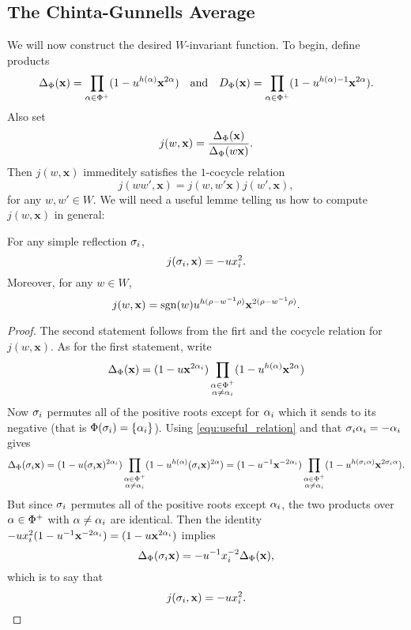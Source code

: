     \subsection*{The Chinta-Gunnells Average}
        We will now construct the desired $W$-invariant function. To begin, define products
        \[
            \Delta_{\Phi}(\mathbf{x}) = \prod_{\alpha \in \Phi^{+}}(1-u^{h(\alpha)}\mathbf{x}^{2\alpha}) \quad \text{and} \quad  D_{\Phi}(\mathbf{x}) = \prod_{\alpha \in \Phi^{+}}(1-u^{h(\alpha)-1}\mathbf{x}^{2\alpha}).
        \]
        Also set
        \[
            j(w,\mathbf{x}) = \frac{\Delta_{\Phi}(\mathbf{x})}{\Delta_{\Phi}(w\mathbf{x})}.
        \]
        Then $j(w,\mathbf{x})$ immeditely satisfies the $1$-cocycle relation
        \[
            j(ww',\mathbf{x}) = j(w,w'\mathbf{x})j(w',\mathbf{x}),
        \]
        for any $w,w' \in W$. We will need a useful lemme telling us how to compute $j(w,\mathbf{x})$ in general:

        \begin{lemma}\label{lem:cocycle_computation}
            For any simple reflection $\sigma_{i}$,
            \[
                j(\sigma_{i},\mathbf{x}) = -ux_{i}^{2}.
            \]
            Moreover, for any $w \in W$,
            \[
                j(w,\mathbf{x}) = \operatorname{\mathrm{sgn}}(w)u^{h(\rho-w^{-1}\rho)}\mathbf{x}^{2(\rho-w^{-1}\rho)}.
            \]
        \end{lemma}
        \begin{proof}
            The second statement follows from the firt and the cocycle relation for $j(w,\mathbf{x})$. As for the first statement, write
            \[
                \Delta_{\Phi}(\mathbf{x}) = (1-u\mathbf{x}^{2\alpha_{i}})\prod_{\substack{\alpha \in \Phi^{+} \\ \alpha \neq \alpha_{i}}}(1-u^{h(\alpha)}\mathbf{x}^{2\alpha})
            \]
            Now $\sigma_{i}$ permutes all of the positive roots except for $\alpha_{i}$ which it sends to its negative (that is $\Phi(\sigma_{i}) = \{\alpha_{i}\}$). Using \cref{equ:useful_relation} and that $\sigma_{i}\alpha_{i} = -\alpha_{i}$ gives
            \[
                \Delta_{\Phi}(\sigma_{i}\mathbf{x}) = (1-u(\sigma_{i}\mathbf{x})^{2\alpha_{i}})\prod_{\substack{\alpha \in \Phi^{+} \\ \alpha \neq \alpha_{i}}}(1-u^{h(\alpha)}(\sigma_{i}\mathbf{x})^{2\alpha}) = (1-u^{-1}\mathbf{x}^{-2\alpha_{i}})\prod_{\substack{\alpha \in \Phi^{+} \\ \alpha \neq \alpha_{i}}}(1-u^{h(\sigma_{i}\alpha)}\mathbf{x}^{2\sigma_{i}\alpha}).
            \]
            But since $\sigma_{i}$ permutes all of the positive roots except $\alpha_{i}$, the two products over $\alpha \in \Phi^{+}$ with $\alpha \neq \alpha_{i}$ are identical. Then the identity $-ux_{i}^{2}(1-u^{-1}\mathbf{x}^{-2\alpha_{i}}) = (1-u\mathbf{x}^{2\alpha_{i}})$ implies 
            \[
                \Delta_{\Phi}(\sigma_{i}\mathbf{x}) = -u^{-1}x_{i}^{-2}\Delta_{\Phi}(\mathbf{x}),
            \]
            which is to say that
            \[
                j(\sigma_{i},\mathbf{x}) = -ux_{i}^{2}.
            \]
        \end{proof}

